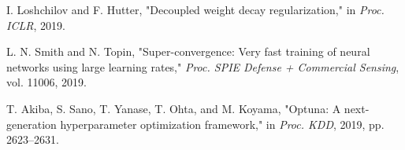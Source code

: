 \documentclass[conference]{IEEEtran}
\begin{document}
\begin{thebibliography}{00}
 I. Loshchilov and F. Hutter, "Decoupled weight decay regularization," in \textit{Proc. ICLR}, 2019.

 L. N. Smith and N. Topin, "Super-convergence: Very fast training of neural networks using large learning rates," \textit{Proc. SPIE Defense + Commercial Sensing}, vol. 11006, 2019.

 T. Akiba, S. Sano, T. Yanase, T. Ohta, and M. Koyama, "Optuna: A next-generation hyperparameter optimization framework," in \textit{Proc. KDD}, 2019, pp. 2623--2631.

\end{thebibliography}
\end{document}
